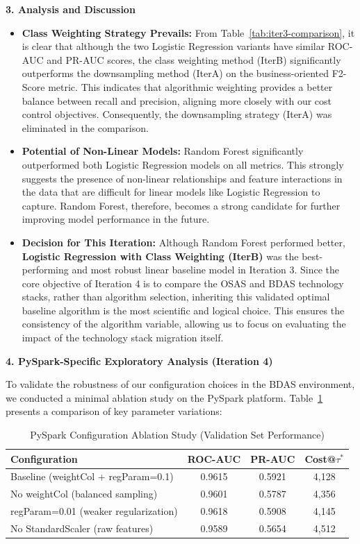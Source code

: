 \documentclass[sigplan,screen]{acmart}
\begin{document}
\textbf{3. Analysis and Discussion}

\begin{itemize}
\item \textbf{Class Weighting Strategy Prevails:} From Table~\ref{tab:iter3-comparison}, it is clear that although the two Logistic Regression variants have similar ROC-AUC and PR-AUC scores, the class weighting method (IterB) significantly outperforms the downsampling method (IterA) on the business-oriented F2-Score metric. This indicates that algorithmic weighting provides a better balance between recall and precision, aligning more closely with our cost control objectives. Consequently, the downsampling strategy (IterA) was eliminated in the comparison.

\item \textbf{Potential of Non-Linear Models:} Random Forest significantly outperformed both Logistic Regression models on all metrics. This strongly suggests the presence of non-linear relationships and feature interactions in the data that are difficult for linear models like Logistic Regression to capture. Random Forest, therefore, becomes a strong candidate for further improving model performance in the future.

\item \textbf{Decision for This Iteration:} Although Random Forest performed better, \textbf{Logistic Regression with Class Weighting (IterB)} was the best-performing and most robust linear baseline model in Iteration 3. Since the core objective of Iteration 4 is to compare the OSAS and BDAS technology stacks, rather than algorithm selection, inheriting this validated optimal baseline algorithm is the most scientific and logical choice. This ensures the consistency of the algorithm variable, allowing us to focus on evaluating the impact of the technology stack migration itself.
\end{itemize}

\textbf{4. PySpark-Specific Exploratory Analysis (Iteration 4)}

To validate the robustness of our configuration choices in the BDAS environment, we conducted a minimal ablation study on the PySpark platform. Table~\ref{tab:pyspark-ablation} presents a comparison of key parameter variations:

\begin{table}[h]
\centering
\caption{PySpark Configuration Ablation Study (Validation Set Performance)}
\label{tab:pyspark-ablation}
\begin{tabular}{|l|c|c|c|}
\hline
\textbf{Configuration} & \textbf{ROC-AUC} & \textbf{PR-AUC} & \textbf{Cost@$\tau^*$} \\
\hline
Baseline (weightCol + regParam=0.1) & 0.9615 & 0.5921 & 4,128 \\
\hline
No weightCol (balanced sampling) & 0.9601 & 0.5787 & 4,356 \\
\hline
regParam=0.01 (weaker regularization) & 0.9618 & 0.5908 & 4,145 \\
\hline
No StandardScaler (raw features) & 0.9589 & 0.5654 & 4,512 \\
\hline
\end{tabular}
\end{table}
\end{document}
